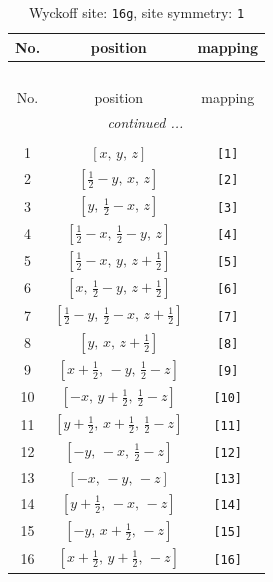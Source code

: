 \documentclass[fleqn,8pt]{jsarticle}
\begin{document}
\begin{longtable}{ccc}
\caption{Wyckoff site: {\tt 16g}, site symmetry: {\tt 1}}
 \\
 \hline \hline
No. & position & mapping \\ \hline \endfirsthead

\multicolumn{2}{l}{\tablename\ \thetable{}} \\
 \hline \hline
No. & position & mapping \\ \hline \endhead

 \hline \hline
\multicolumn{2}{r}{\footnotesize\it continued ...} \\ \endfoot

 \hline \hline
\multicolumn{2}{r}{} \\ \endlastfoot

1 & $\left[ x,\, y,\, z \right]$ & {\tt [1]} \\ \hline
2 & $\left[ \frac{1}{2} - y,\, x,\, z \right]$ & {\tt [2]} \\ \hline
3 & $\left[ y,\, \frac{1}{2} - x,\, z \right]$ & {\tt [3]} \\ \hline
4 & $\left[ \frac{1}{2} - x,\, \frac{1}{2} - y,\, z \right]$ & {\tt [4]} \\ \hline
5 & $\left[ \frac{1}{2} - x,\, y,\, z + \frac{1}{2} \right]$ & {\tt [5]} \\ \hline
6 & $\left[ x,\, \frac{1}{2} - y,\, z + \frac{1}{2} \right]$ & {\tt [6]} \\ \hline
7 & $\left[ \frac{1}{2} - y,\, \frac{1}{2} - x,\, z + \frac{1}{2} \right]$ & {\tt [7]} \\ \hline
8 & $\left[ y,\, x,\, z + \frac{1}{2} \right]$ & {\tt [8]} \\ \hline
9 & $\left[ x + \frac{1}{2},\, - y,\, \frac{1}{2} - z \right]$ & {\tt [9]} \\ \hline
10 & $\left[ - x,\, y + \frac{1}{2},\, \frac{1}{2} - z \right]$ & {\tt [10]} \\ \hline
11 & $\left[ y + \frac{1}{2},\, x + \frac{1}{2},\, \frac{1}{2} - z \right]$ & {\tt [11]} \\ \hline
12 & $\left[ - y,\, - x,\, \frac{1}{2} - z \right]$ & {\tt [12]} \\ \hline
13 & $\left[ - x,\, - y,\, - z \right]$ & {\tt [13]} \\ \hline
14 & $\left[ y + \frac{1}{2},\, - x,\, - z \right]$ & {\tt [14]} \\ \hline
15 & $\left[ - y,\, x + \frac{1}{2},\, - z \right]$ & {\tt [15]} \\ \hline
16 & $\left[ x + \frac{1}{2},\, y + \frac{1}{2},\, - z \right]$ & {\tt [16]} \\
\end{longtable}
\end{document}
